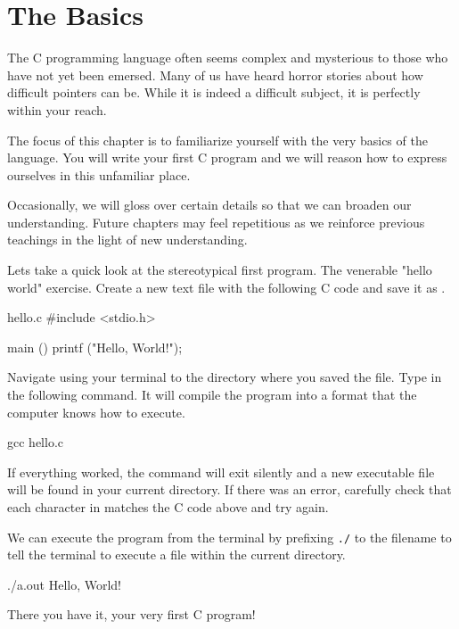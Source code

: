 \chapter{The Basics}

The C programming language often seems complex and mysterious to those who have
not yet been emersed. Many of us have heard horror stories about how difficult
pointers can be. While it is indeed a difficult subject, it is perfectly within
your reach.

The focus of this chapter is to familiarize yourself with the very basics of
the language. You will write your first C program and we will reason how to
express ourselves in this unfamiliar place.

Occasionally, we will gloss over certain details so that we can broaden our
understanding. Future chapters may feel repetitious as we reinforce previous
teachings in the light of new understanding.

Lets take a quick look at the stereotypical first program. The venerable
"hello world" exercise. Create a new text file with the following C code and
save it as .

\begin{code}{hello.c}
#include <stdio.h>

main ()
{
    printf ("Hello, World!\n");
}
\end{code}

Navigate using your terminal to the directory where you saved the file. Type in
the following command. It will compile the program into a format that the
computer knows how to execute.

\begin{Terminal}
gcc hello.c
\end{Terminal}

If everything worked, the  command will exit silently and a new
executable file  will be found in your current directory. If there
was an error, carefully check that each character in  matches the
C code above and try again.

We can execute the program from the terminal by prefixing \verb|./| to the
filename to tell the terminal to execute a file within the current directory.

\begin{Terminal}
./a.out
Hello, World!
\end{Terminal}

There you have it, your very first C program!


